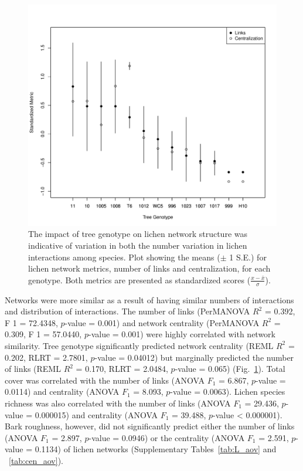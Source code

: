 \documentclass[9pt,twocolumn,twoside,lineno]{pnas-new}
\begin{document}
{\begin{figure}[ht]
\centering
\includegraphics[width=\linewidth]{cn_metrics.pdf}
\caption{The impact of tree genotype on lichen network structure was
  indicative of variation in both the number variation in lichen
  interactions among species. Plot showing the means ($\pm$ 1 S.E.)
  for lichen network metrics, number of links and centralization, for
  each genotype. Both metrics are presented as standardized scores
  ($\frac{x - \bar{x}}{\sigma}$).}
\label{fig:cn_metrics}
\end{figure}


Networks were more similar as a result of having similar numbers of
interactions and distribution of interactions. The number of links
(PerMANOVA $R^2$ = 0.392, F 1 = 72.4348, $p$-value = 0.001) and
network centrality (PerMANOVA $R^2$ = 0.309, F 1 = 57.0440, $p$-value
= 0.001) were highly correlated with network similarity.  Tree
genotype significantly predicted network centrality (REML $R^2$ =
0.202, RLRT = 2.7801, $p$-value = 0.04012) but marginally predicted
the number of links (REML $R^2$ = 0.170, RLRT = 2.0484, $p$-value =
0.065) (Fig.~\ref{fig:cn_metrics}). Total cover was correlated with
the number of links (ANOVA $F_1$ = 6.867, $p$-value = 0.0114) and
centrality (ANOVA $F_1$ = 8.093, $p$-value = 0.0063). Lichen species
richness was also correlated with the number of links (ANOVA $F_1$ =
29.436, $p$-value = 0.000015) and centrality (ANOVA $F_1$ = 39.488,
$p$-value < 0.000001). Bark roughness, however, did not significantly
predict either the number of links (ANOVA $F_1$ = 2.897, $p$-value =
0.0946) or the centrality (ANOVA $F_1$ = 2.591, $p$-value = 0.1134) of
lichen networks (Supplementary Tables~\ref{tab:L_aov} and
~\ref{tab:cen_aov}).


}
\end{document}
